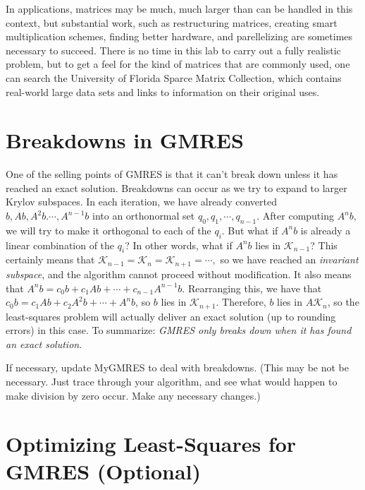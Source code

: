 \begin{info}
In applications, matrices may be much, much larger than can be handled in this context, but substantial work, such as restructuring matrices, creating smart multiplication schemes, finding better hardware, and parellelizing are sometimes necessary to succeed.
There is no time in this lab to carry out a fully realistic problem, but to get a feel for the kind of matrices that are commonly used, one can search the University of Florida Sparce Matrix Collection, which contains real-world large data sets and links to information on their original uses.
\end{info}

\section*{Breakdowns in GMRES}
One of the selling points of GMRES is that it can't break down unless it has reached an exact solution.
Breakdowns can occur as we try to expand to larger Krylov subspaces.
In each iteration, we have already converted $b,Ab,A^2b.\cdots, A^{n-1}b$ into an orthonormal set $q_0,q_1,\cdots,q_{n-1}$.
After computing $A^nb,$ we will try to make it orthogonal to each of the $q_i$.
But what if $A^nb$ is already a linear combination of the $q_i$? In other words, what if $A^nb$ lies in $\mathcal{K}_{n-1}$?
This certainly means that $\mathcal{K}_{n-1}=\mathcal{K}_n=\mathcal{K}_{n+1}=\cdots,$ so we have reached an \textit{invariant subspace}, and the algorithm cannot proceed without modification.
It also means that $A^nb=c_0b+c_1Ab+\cdots+c_{n-1}A^{n-1}b.$
Rearranging this, we have that $c_0b=c_1Ab+c_2A^2b+\cdots+A^{n}b$, so $b$ lies in $\mathcal{K}_{n+1}$.
Therefore, $b$ lies in $A\mathcal{K}_n$, so the least-squares problem will actually deliver an exact solution (up to rounding errors) in this case.
To summarize: \textit{GMRES only breaks down when it has found an exact solution}.

\begin{problem}
\label{prob:GMRES3}
If necessary, update MyGMRES to deal with breakdowns.
(This may be not be necessary.
Just trace through your algorithm, and see what would happen to make division by zero occur.
Make any necessary changes.)
\end{problem}

\section*{Optimizing Least-Squares for GMRES (Optional)}

